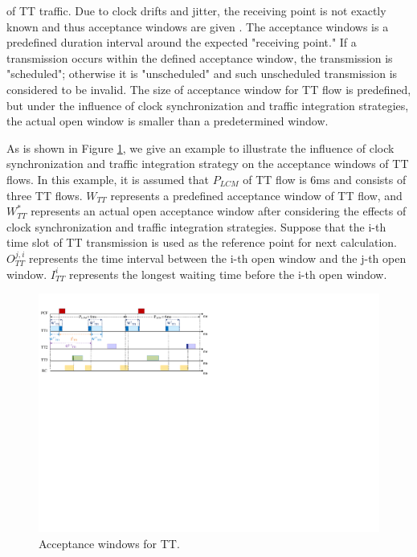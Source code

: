 \documentclass[electronics,article,accept,moreauthors,pdftex]{Definitions/mdpi}
\begin{document}
 of TT traffic. Due to clock drifts and jitter, the receiving point is not exactly known and thus acceptance windows are given \cite{perathoner2007influence}. The acceptance windows is a predefined duration interval around the expected "receiving point." If a transmission occurs within the defined acceptance window, the transmission is "scheduled"; otherwise it is "unscheduled" and such unscheduled transmission is considered to be invalid. The size of acceptance window for TT flow is predefined, but under the influence of clock synchronization and traffic integration strategies, the actual open window is smaller than a predetermined window.

As is shown in {Figure} \ref{inf}, we give an example to illustrate the influence of clock synchronization and traffic integration strategy on the acceptance windows of TT flows. In this example, it is assumed that $P_{LCM}$ of TT flow is 6ms and consists of three TT flows. $W_{TT}$ represents a predefined acceptance window of TT flow, and $W^*_{TT}$ represents an actual open acceptance window after considering the effects of clock synchronization and traffic integration strategies. Suppose that the i-th time slot of TT transmission is used as the reference point for next calculation. $O^{j,i}_{TT}$ represents the time interval between the i-th open window and the j-th open window. $I^i_{TT}$ represents the longest waiting time before the i-th open window.

\begin{figure}[H]
\centering
\includegraphics[scale=0.44]{figures/pri_influ}
\caption{Acceptance windows for TT.}
\label{inf}
\end{figure}
\end{document}
